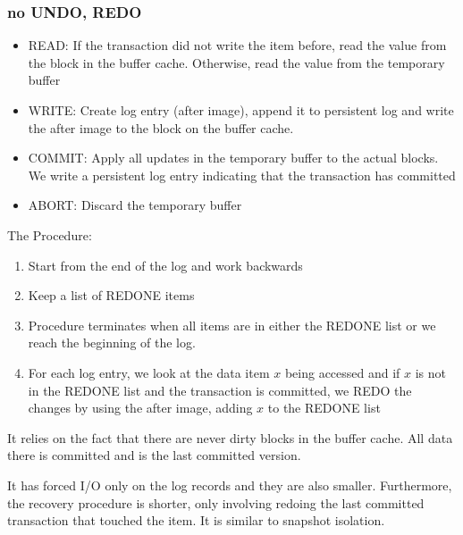 \subsubsection{no UNDO, REDO}
\begin{itemize}
    \item READ: If the transaction did not write the item before, read the value from the block in the buffer cache. Otherwise, read the value from the temporary buffer
    \item WRITE: Create log entry (after image), append it to persistent log and write the after image to the block on the buffer cache.
    \item COMMIT: Apply all updates in the temporary buffer to the actual blocks. We write a persistent log entry indicating that the transaction has committed
    \item ABORT: Discard the temporary buffer
\end{itemize}
The Procedure:
\begin{enumerate}
    \item Start from the end of the log and work backwards
    \item Keep a list of REDONE items
    \item Procedure terminates when all items are in either the REDONE list or we reach the beginning of the log.
    \item For each log entry, we look at the data item $x$ being accessed and if $x$ is not in the REDONE list and the transaction is committed,
          we REDO the changes by using the after image, adding $x$ to the REDONE list
\end{enumerate}
It relies on the fact that there are never dirty blocks in the buffer cache. All data there is committed and is the last committed version.

It has forced I/O only on the log records and they are also smaller.
Furthermore, the recovery procedure is shorter, only involving redoing the last committed transaction that touched the item.
It is similar to snapshot isolation.


